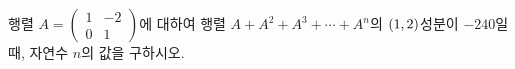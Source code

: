 행렬 $A=\begin{pmatrix} 1 & -2 \\ 0 & 1 \end{pmatrix}$에 대하여 행렬 $A+A^2+A^3+\cdots+A^n$의 $(1{,}\mkern3mu\mathopen{}2)$성분이 $-240$일 때, 자연수 $n$의 값을 구하시오.
